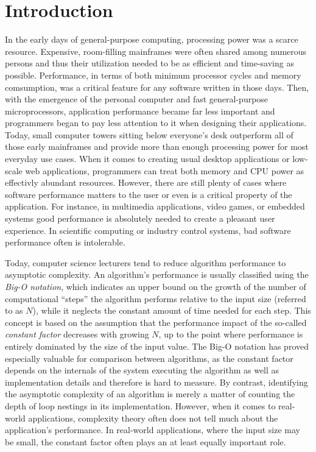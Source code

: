 \section{Introduction}
In the early days of general-purpose computing, processing power was a scarce resource. Expensive, room-filling mainframes were often shared among numerous persons and thus their utilization needed to be as efficient and time-saving as possible.   Performance, in terms of both minimum processor cycles and memory comsumption, was a critical feature for any software written in those days. Then, with the emergence of the personal computer and fast general-purpose microprocessors, application performance became far less important and programmers began to pay less attention to it when designing their applications. Today, small computer towers sitting below everyone's desk outperform all of those early mainframes and provide more than enough processing power for most everyday use cases. When it comes to creating usual desktop applications or low-scale web applications, programmers can treat both memory and CPU power as effectivly abundant resources. However, there are still plenty of cases where software performance matters to the user or even is a critical property of the application. For instance, in multimedia applications, video games, or embedded systems good performance is absolutely needed to create a pleasant user experience. In scientific computing or industry control systems, bad software performance often is intolerable.

Today, computer science lecturers tend to reduce algorithm performance to asymptotic complexity. An algorithm's performance is usually classified using the \emph{Big-O notation}, which indicates an upper bound on the growth of the number of computational ``steps'' the algorithm performs relative to the input size (referred to as $N$), while it neglects the constant amount of time needed for each step. This concept is based on the assumption that the performance impact of the so-called \emph{constant factor} decreases with growing $N$, up to the point where performance is entirely dominated by the size of the input value. The Big-O notation has proved especially valuable for comparison between algorithms, as the constant factor depends on the internals of the system executing the algorithm as well as implementation details and therefore is hard to measure. By contrast, identifying the asymptotic complexity of an algorithm is merely a matter of counting the depth of loop nestings in its implementation. However, when it comes to real-world applications, complexity theory often does not tell much about the application's performance. In real-world applications, where the input size may be small, the constant factor often plays an at least equally important role.

